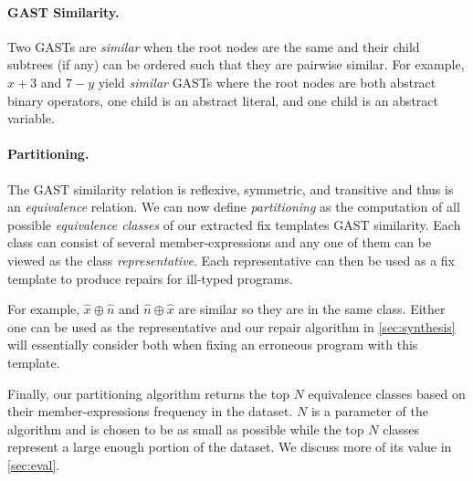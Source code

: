 

\paragraph{GAST Similarity.}
Two GASTs are \emph{similar} when
the root nodes are the same and their child subtrees (if any) can be ordered
such that they are pairwise similar. For example, $x + 3$ and $7 - y$ yield
\emph{similar} GASTs where the root nodes are both abstract binary operators,
one child is an abstract literal, and one child is an abstract variable.

\paragraph{Partitioning.}
The GAST similarity relation is reflexive, symmetric, and transitive and thus is an
\emph{equivalence} relation. We can now define \emph{partitioning} as the
computation of all possible \emph{equivalence classes} of our extracted fix
templates \wrt GAST similarity. Each class can consist of several
member-expressions and any one of them can be viewed as the class
\emph{representative}. Each representative can then be used as
a fix template to produce repairs for ill-typed programs.

For example, $\hat{x} \oplus \hat{n}$ and $\hat{n}
\oplus \hat{x}$ are similar so they are in the
same class. Either one can be used as the representative and our repair
algorithm in \autoref{sec:synthesis} will essentially consider both when fixing
an erroneous program with this template.

Finally, our partitioning algorithm returns the top $N$ equivalence classes
based on their member-expressions frequency in the dataset. $N$ is a parameter
of the algorithm and is chosen to be as small as possible while the top $N$
classes represent a large enough portion of the dataset. We discuss more of its
value in \autoref{sec:eval}.
